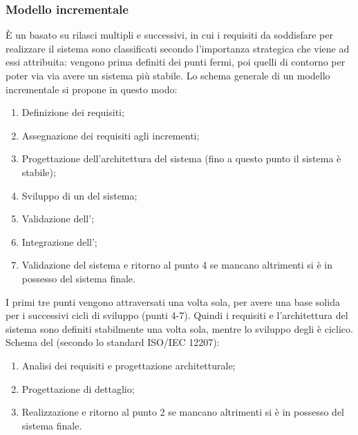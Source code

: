 \documentclass[../main]{subfiles}
\begin{document}
\subsubsection{Modello incrementale}
È un  basato su rilasci multipli e successivi, in cui i requisiti da soddisfare per realizzare il sistema sono classificati secondo l'importanza strategica che viene ad essi attribuita: vengono prima definiti dei punti fermi, poi quelli di contorno per poter via via avere un sistema più stabile.
Lo schema generale di un modello incrementale si propone in questo modo:
\begin{enumerate}
    \item Definizione dei requisiti; %
    \item Assegnazione dei requisiti agli incrementi; %
    \item Progettazione dell'architettura del sistema (fino a questo punto il sistema è stabile); %
    \item Sviluppo di un  del sistema; %
    \item Validazione dell'; %
    \item Integrazione dell'; %
    \item Validazione del sistema e ritorno al punto 4 se mancano  altrimenti si è in possesso del sistema finale. %
\end{enumerate}
I primi tre punti vengono attraversati una volta sola, per avere una base solida per i successivi cicli di sviluppo (punti 4-7). Quindi i requisiti e l'architettura del sistema sono definiti stabilmente una volta sola, mentre lo sviluppo degli  è ciclico.
Schema del  (secondo lo standard ISO/IEC 12207):
\begin{enumerate}
    \item Analisi dei requisiti e progettazione architetturale;
    \item Progettazione di dettaglio;
    \item Realizzazione e ritorno al punto 2 se mancano  altrimenti si è in possesso del sistema finale.
\end{enumerate}
\end{document}
